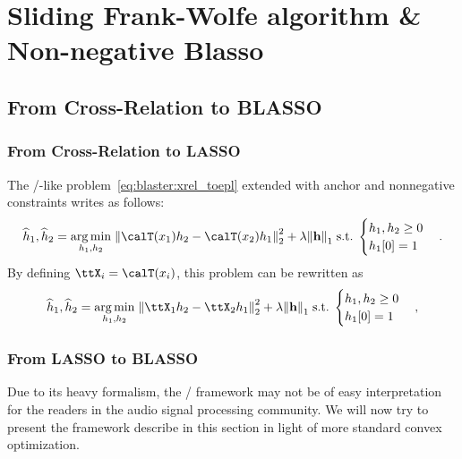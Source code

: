 \chapter{Sliding Frank-Wolfe algorithm \& Non-negative Blasso}\label{ap:blaster}
\section{From Cross-Relation to BLASSO}\label{ap:blaster:lasso}

\subsection{From Cross-Relation to LASSO}
The \LASSO/-like problem~\cref{eq:blaster:xrel_toepl} extended with anchor and nonnegative constraints writes as follows:
\begin{equation}
    \disFilterHat_1, \disFilterHat_2
    =
    \kargmin_{\disFilter_1, \disFilter_2}
    \;
    \kvvbar{
        \calT(\disRecordedSignal_1) \disFilter_2
        -
        \calT(\disRecordedSignal_2) \disFilter_1
    }_2^2
    +
    \lambda
    \kvvbar{
        \mathbf{\disFilter}
    }_1
    \; \text{s.t.} \;
    \begin{cases}
        \disFilter_1, \disFilter_2 \geq 0 \\
        \disFilter_1[0] = 1\\
    \end{cases}
    .
\end{equation}
By defining $\ttX_i = \calT(\disRecordedSignal_i)$, this problem can be rewritten as
\begin{equation}
    \disFilterHat_1, \disFilterHat_2
    =
    \kargmin_{\disFilter_1, \disFilter_2}
    \;
    \kvvbar{
        \ttX_1 \disFilter_2
        -
        \ttX_2 \disFilter_1
    }_2^2
    +
    \lambda
    \kvvbar{
        \mathbf{\disFilter}
    }_1
    \; \text{s.t.} \;
    \begin{cases}
        \disFilter_1, \disFilter_2 \geq 0 \\
        \disFilter_1[0] = 1\\
    \end{cases}
    ,
\end{equation}

\subsection{From LASSO to BLASSO}
Due to its heavy formalism, the \CD/ framework may not be of easy interpretation for the readers in the audio signal processing community.
We will now try to present the framework describe in this section in light of more standard convex optimization.

